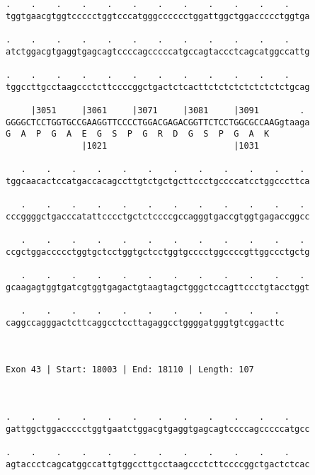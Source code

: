 \documentclass{article}
\begin{document}
\begin{Verbatim}
.    .    .    .    .    .    .    .    .    .    .    .    
tggtgaacgtggtccccctggtcccatgggcccccctggattggctggaccccctggtga
                                                            
.    .    .    .    .    .    .    .    .    .    .    .    
atctggacgtgaggtgagcagtccccagcccccatgccagtaccctcagcatggccattg
                                                            
.    .    .    .    .    .    .    .    .    .    .    .    
tggccttgcctaagccctcttccccggctgactctcacttctctctctctctctctgcag
                                                            
     |3051     |3061     |3071     |3081     |3091        . 
GGGGCTCCTGGTGCCGAAGGTTCCCCTGGACGAGACGGTTCTCCTGGCGCCAAGgtaaga
G  A  P  G  A  E  G  S  P  G  R  D  G  S  P  G  A  K        
               |1021                         |1031          
  
   .    .    .    .    .    .    .    .    .    .    .    . 
tggcaacactccatgaccacagccttgtctgctgcttccctgccccatcctggcccttca
                                                            
   .    .    .    .    .    .    .    .    .    .    .    . 
cccggggctgacccatattcccctgctctccccgccagggtgaccgtggtgagaccggcc
                                                            
   .    .    .    .    .    .    .    .    .    .    .    . 
ccgctggaccccctggtgctcctggtgctcctggtgcccctggccccgttggccctgctg
                                                            
   .    .    .    .    .    .    .    .    .    .    .    . 
gcaagagtggtgatcgtggtgagactgtaagtagctgggctccagttccctgtacctggt
                                                            
   .    .    .    .    .    .    .    .    .    .    . 
caggccagggactcttcaggcctccttagaggcctggggatgggtgtcggacttc
                                                       
                                                       
 
Exon 43 | Start: 18003 | End: 18110 | Length: 107



.    .    .    .    .    .    .    .    .    .    .    .    
gattggctggaccccctggtgaatctggacgtgaggtgagcagtccccagcccccatgcc
                                                            
.    .    .    .    .    .    .    .    .    .    .    .    
agtaccctcagcatggccattgtggccttgcctaagccctcttccccggctgactctcac
                                                            

\end{Verbatim}
\end{document}
